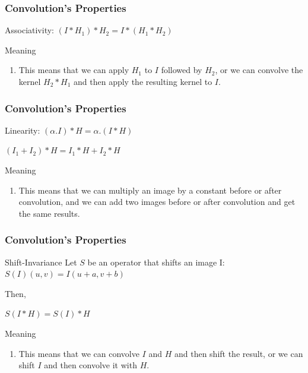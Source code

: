 \documentclass[english,11pt,table,handout]{beamer}
\begin{document}
\frame
{
	\frametitle{Convolution's Properties}
	\begin{block}{Associativity:}
		\centering
		$(I * H_{1})*H_{2} =I * (H_{1}*H_{2})$
	\end{block}
	\begin{alertblock}{Meaning}
		\begin{enumerate}
			\item This means that we can apply $H_{1}$ to $I$ followed by $H_{2}$, or we can convolve the kernel $H_{2} * H_{1}$  and then apply the resulting kernel to $I$.
		\end{enumerate}		
		
	\end{alertblock}
}
\frame
{
	\frametitle{Convolution's Properties}
	\begin{block}{Linearity:}
		\centering
		$(\alpha .I)* H = \alpha. (I * H)$
		
		$(I_{1} + I_{2}) * H = I_{1} * H + I_{2}*H$
		
	\end{block}
	\begin{alertblock}{Meaning}
		\begin{enumerate}
			\item This means that we can multiply an image by a constant before or after convolution, and we can add two images before or after convolution and get the same results. 
		\end{enumerate}		
		
	\end{alertblock}
}
\frame
{
	\frametitle{Convolution's Properties}
	\begin{block}{Shift-Invariance}
		Let $S$ be an operator that shifts an image I:
		\centering
		$S(I)(u,v) = I(u+a, v+b)$
		
		
		\flushleft Then,
		
		\centering
		$S(I*H) = S(I)*H$
		
	\end{block}
	\begin{alertblock}{Meaning}
		
		\begin{enumerate}
			\item This means that we can convolve $I$ and $H$ and then shift the result, or we can shift $I$ and then convolve it with $H$.
		\end{enumerate}		
		
	\end{alertblock}
}
\end{document}
